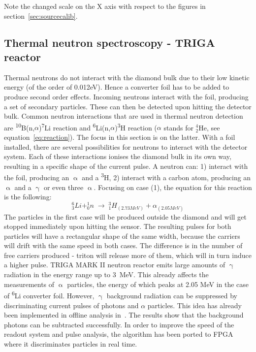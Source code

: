 \documentclass[12pt]{packages/mytustyle}  %
\begin{document}
Note the changed scale on the X axis with respect to the figures in section~\ref{sec:sourcecalib}.

\subsection{Thermal neutron spectroscopy - TRIGA reactor}

Thermal neutrons do not interact with the diamond bulk due to their low kinetic energy (of the order of 0.012eV). Hence a converter foil has to be added to produce second order effects. Incoming neutrons interact with the foil, producing a set of secondary particles. These can then be detected upon hitting the detector bulk. Common neutron interactions that are used in thermal neutron detection are \textsuperscript{10}B(n,$\alpha$)\textsuperscript{7}Li reaction and \textsuperscript{6}Li(n,$\alpha$)\textsuperscript{3}H reaction ($\alpha$ stands for $^4_2$He, see equation~\ref{eq:reaction}). The focus in this section is on the latter. With a foil installed, there are several possibilities for neutrons to interact with the detector system. Each of these interactions ionises the diamond bulk in its own way, resulting in a specific shape of the current pulse. A neutron can: 1) interact with the foil, producing an $\upalpha$ and a \textsuperscript{3}H, 2) interact with a carbon atom, producing an $\upalpha$ and a $\upgamma$ or even three $\upalpha$. Focusing on case (1), the equation for this reaction is the following:
\begin{equation}
\label{eq:reaction}
   ^6_3Li   +   ^1_0n \;\rightarrow\; ^3_1H_{(2.73 MeV)} + \alpha_{(2.05 MeV)}
\end{equation}
The particles in the first case will be produced outside the diamond and will get stopped immediately upon hitting the sensor. The resulting pulses for both particles will have a rectangular shape of the same width, because the carriers will drift with the same speed in both cases. The difference is in the number of free carriers produced - triton will release more of them, which will in turn induce a higher pulse.
TRIGA MARK II neutron reactor emits large amounts of $\upgamma$ radiation in the energy range up to 3~MeV. This already affects the measurements of $\upalpha$ particles, the energy of which peaks at 2.05 MeV in the case of \textsuperscript{6}Li converter foil. However, $\upgamma$ background radiation can be suppressed by discriminating current pulses of photons and $\alpha$ particles. This idea has already been implemented in offline analysis in~\cite{}. The results show that the background photons can be subtracted successfully. In order to improve the speed of the readout system and pulse analysis, the algorithm has been ported to FPGA where it discriminates particles in real time. 
\end{document}
